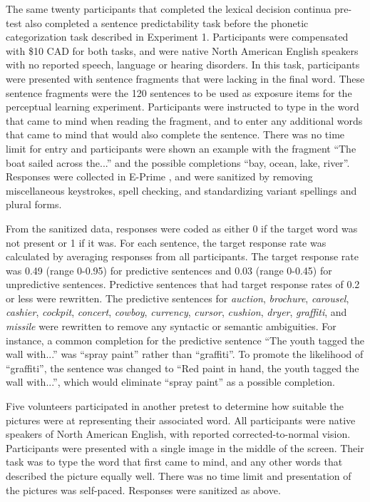 The same twenty participants that completed the lexical decision continua pre-test also completed a sentence predictability task before the phonetic categorization task described in Experiment 1. 
Participants were compensated with \$10 CAD for both tasks, and were native North American English speakers with no reported speech, language or hearing disorders. 
In this task, participants were presented with sentence fragments that were lacking in the final word.  
These sentence fragments were the 120 sentences to be used as exposure items for the perceptual learning experiment.
Participants were instructed to type in the word that came to mind when reading the fragment, and to enter any additional words that came to mind that would also complete the sentence.  
There was no time limit for entry and participants were shown an example with the fragment ``The boat sailed across the...'' and the possible completions ``bay, ocean, lake, river''.  
Responses were collected in E-Prime \citep{PsychologySoftwareTools2012}, and were sanitized by removing miscellaneous keystrokes, spell checking, and standardizing variant spellings and plural forms.

From the sanitized data, responses were coded as either 0 if the target word was not present or 1 if it was.
For each sentence, the target response rate was calculated by averaging responses from all participants.
The target response rate was 0.49 (range 0-0.95) for predictive sentences and 0.03 (range 0-0.45) for unpredictive sentences.
Predictive sentences that had target response rates of 0.2 or less were rewritten.  
The predictive sentences for \emph{auction}, \emph{brochure}, \emph{carousel}, \emph{cashier}, \emph{cockpit}, \emph{concert}, \emph{cowboy}, \emph{currency}, \emph{cursor}, \emph{cushion}, \emph{dryer}, \emph{graffiti}, and \emph{missile} were rewritten to remove any syntactic or semantic ambiguities.
For instance, a common completion for the predictive sentence ``The youth tagged the wall with...'' was ``spray paint'' rather than ``graffiti''.
To promote the likelihood of ``graffiti'', the sentence was changed to ``Red paint in hand, the youth tagged the wall with...'', which would eliminate ``spray paint'' as a possible completion.

Five volunteers participated in another pretest to determine how suitable the pictures were at representing their associated word.  
All participants were native speakers of North American English, with reported corrected-to-normal vision. Participants were presented with a single image in the middle of the screen.  
Their task was to type the word that first came to mind, and any other words that described the picture equally well.  
There was no time limit and presentation of the pictures was self-paced. Responses were sanitized as above.  

